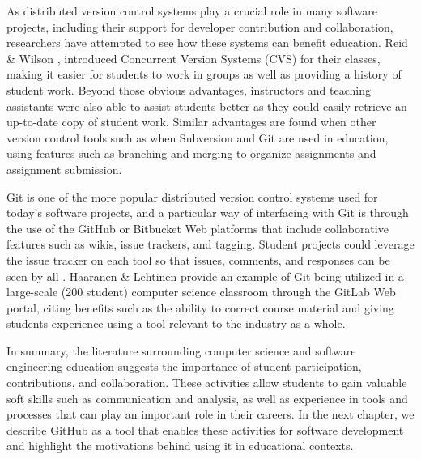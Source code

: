 As distributed version control systems play a crucial role in many software projects, including their support for developer contribution and collaboration, researchers have attempted to see how these systems can benefit education. Reid \& Wilson \cite{reid2005learning}, introduced Concurrent Version Systems (CVS) for their classes, making it easier for students to work in groups as well as providing a history of student work. Beyond those obvious advantages, instructors and teaching assistants were also able to assist students better as they could easily retrieve an up-to-date copy of student work. Similar advantages are found when other version control tools such as when Subversion \cite{clifton2007subverting} and Git \cite{griffin2013github} are used in education, using features such as branching and merging to organize assignments and assignment submission.

Git is one of the more popular distributed version control systems used for today's software projects, and a particular way of interfacing with Git is through the use of the GitHub or Bitbucket Web platforms that include collaborative features such as wikis, issue trackers, and tagging. Student projects could leverage the issue tracker on each tool so that issues, comments, and responses can be seen by all \cite{kelleher2014employing}. Haaranen \& Lehtinen \cite{haaranen2015teaching} provide an example of Git being utilized in a large-scale (200 student) computer science classroom through the GitLab Web portal, citing benefits such as the ability to correct course material and giving students experience using a tool relevant to the industry as a whole.

In summary, the literature surrounding computer science and software engineering education suggests the importance of student participation, contributions, and collaboration. These activities allow students to gain valuable soft skills such as communication and analysis, as well as experience in tools and processes that  can play an important role in their careers. In the next chapter, we describe GitHub as a tool that enables these activities for software development and highlight the motivations behind using it in educational contexts.





